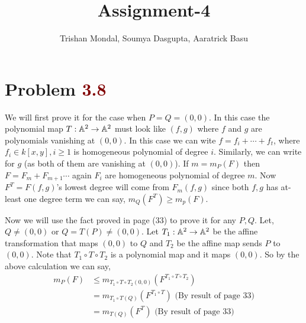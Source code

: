 \documentclass[12pt]{article}
\title{\textbf{Assignment-4}}
\author{Trishan Mondal, Soumya Dasgupta, Aaratrick Basu}
\date{}
\begin{document}
\maketitle


\section{Problem \textcolor{maroon}{3.8}} %

 We will first prove it for the case when $P = Q =(0,0)$. In this case the polynomial map $T : \mathbb{A}^2 \to \mathbb{A}^2$ must look like $(f,g)$ where $f$ and $g$ are polynomials vanishing at $(0,0)$. In this case we can wite $f = f_i + \cdots + f_t$, where $f_i  \in k[x,y],i \geq 1$ is homogeneous polynomial of degree $i$. Similarly, we can write for $g$ (as both of them are vanishing at $(0,0)$). If $m = m_P(F)$ then $F = F_m +F_{m+1}\cdots$ again $F_i$ are homogeneous polynomial of degree $m$. Now $F^T = F(f,g)$'s lowest degree will come from $F_m(f,g)$ since both $f,g$ has at-least one degree term we can say, $m_Q(F^T)\geq m_p(F)$.  

\vspace*{0.2cm}

 Now we will use the fact proved in page (33) to prove it for any $P,Q$. Let, $Q\neq (0,0)$ or $Q = T(P)\neq (0,0)$. Let $T_1 : \mathbb{A}^2 \to \mathbb{A}^2$ be the affine transformation that maps $(0,0)$ to $Q$ and $T_2$ be the affine map sends $P$ to $(0,0)$. Note that $T_1  \circ T \circ T_2$ is a polynomial map and it maps $(0,0)$. So by the above calculation we can say, \begin{align*}
    m_P(F) &\leq m_{T_1  \circ T \circ T_2(0,0)}(F^{T_1  \circ T \circ T_2}) \\
    &= m_{T_1  \circ T (Q)}(F^{T_1  \circ T }) \text{ (By result of page 33})\\
    &= m_{T (Q)}(F^{T }) \text{ (By result of page 33})
 \end{align*}

 \vspace*{0.2cm}
\end{document}
